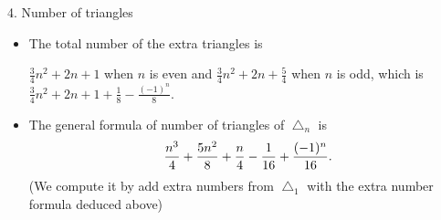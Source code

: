 \documentclass{beamer}
\begin{document}
\begin{frame}{4. Number of triangles}
\begin{itemize}
\begin{itemize}
\begin{minipage}{0.7\linewidth}
                  \begin{itemize}
                    \item $n=2k$ is even\\
                          We can see that each extra down triangle must satisfy that  its lowest vertex $A$ lie on the
                          line $l$.
                          With different $A$, we have $2(1+2+\cdots+k)=k(k+1)=\frac{n^2}{4}+\frac{n}{2}$ extra triangles.
                    \item $n=2k+1$ is odd\\
                          Move $A$ from left to center point (showing as the dashed line and the right side is symmetric
                          with left), we have $2(1+2+\cdots+k)+(k+1)=(k+1)^2=(\frac{n+1}{4})^2$ extra triangles.
                  \end{itemize}
                                    \end{minipage}%
                   \begin{minipage}{0.2\linewidth}\hspace*{2em}
                \end{minipage}
             \framebreak     
            \item The total number of the extra triangles  is
                  
                  $\frac{3}{4}n^2+2n+1$ when $n$ is even and  $\frac{3}{4}n^2+2n+\frac{5}{4}$ when $n$ is odd, which is
                  $ \frac{3}{4}n^2+2n+1+\frac{1}{8}-\frac{(-1)^n }{8}$.
            \item The general formula of number of triangles of $\bigtriangleup_n$ is
                  \begin{align*}
                    \frac{n^3}{4}+{5n^2\over 8}+{n\over 4} -{1\over 16}+ {(-1)^{n}\over 16}.
                  \end{align*}
                  (We compute it by add extra numbers from $\bigtriangleup_1$ with the extra number formula deduced above) 
          \end{itemize}
          

\end{itemize}
\end{frame}
\end{document}
